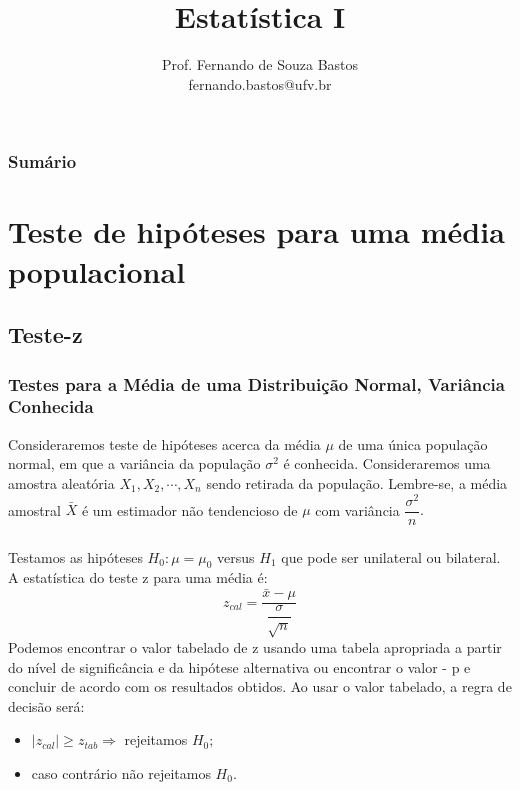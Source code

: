 \documentclass[14pt,aspectratio=1610]{beamer}
\title{Estatística I}
\author{Prof. Fernando de Souza Bastos \texorpdfstring{\\ fernando.bastos@ufv.br}{}}
\institute{Departamento de Estatística \texorpdfstring{\\ Universidade Federal de Viçosa}{}\texorpdfstring{\\ Campus UFV - Viçosa}{}}
\date{}
\newcommand{\bx}{\ensuremath{\bar{x}}}
\newcommand{\Ho}{\ensuremath{H_{0}}}
\newcommand{\Hi}{\ensuremath{H_{1}}}
\begin{document}
%

\frame{\titlepage}

\begin{frame}{}
\frametitle{\bf Sumário}
\tableofcontents
\end{frame}



\section{Teste de hipóteses para uma média populacional}
\subsection{Teste-z}
\begin{frame}{}
\frametitle{Testes para a Média de uma Distribuição Normal, Variância Conhecida}
\begin{block}{}
\justifying
Consideraremos teste de hipóteses acerca da média $\mu$ de uma única população normal, em que a variância da população $\sigma^{2}$ é conhecida. Consideraremos uma amostra aleatória $X_{1}, X_{2},\cdots, X_{n}$ sendo retirada da população. Lembre-se, a média amostral $\bar{X}$ é um estimador não tendencioso de $\mu$ com 
variância $\dfrac{\sigma^{2}}{n}.$
\end{block}
\end{frame}

\begin{frame}{}
\frametitle{}
\small
\begin{block}{}
\justifying
Testamos as hipóteses $\Ho:\mu=\mu_{0}$ versus $\Hi$ que pode ser unilateral ou bilateral. A estatística do teste z para uma média é:
$$z_{cal}=\dfrac{\bx-\mu}{\dfrac{\sigma}{\sqrt{n}}}$$
Podemos encontrar o valor tabelado de z usando uma tabela apropriada a partir do nível de significância e da hipótese alternativa ou 
encontrar o valor - p e concluir de acordo com os resultados obtidos. Ao usar o valor tabelado, a regra de decisão será:
\begin{itemize}
\item $|z_{cal}|\geq z_{tab}\Rightarrow$ rejeitamos $\Ho;$
\item caso contrário não rejeitamos $\Ho.$
\end{itemize}
\end{block}
\end{frame}
\end{document}
